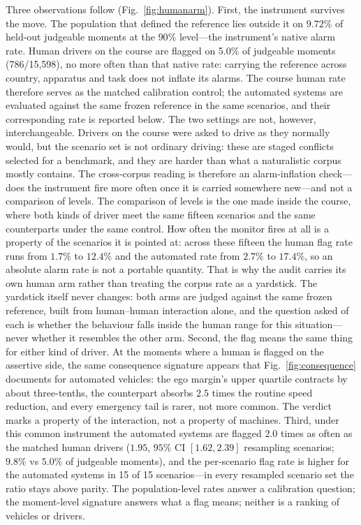 \documentclass[12pt,a4paper]{article}
\begin{document}
Three observations follow (Fig.~\ref{fig:humanarm}). First, the instrument survives the move. The
population that defined the reference lies outside it on $9.72\%$ of held-out judgeable moments at
the $90\%$ level---the instrument's native alarm rate. Human drivers on the course are flagged on
5.0\% of judgeable moments (786/15{,}598), no more often than
that native rate: carrying the reference across country, apparatus and task does not inflate its
alarms. The course human rate therefore serves as the matched calibration control; the automated systems are
evaluated against the same frozen reference in the same scenarios, and their corresponding rate is
reported below. The two settings are not, however, interchangeable. Drivers on the course were asked to drive
as they normally would, but the scenario set is not ordinary driving: these are staged conflicts
selected for a benchmark, and they are harder than what a naturalistic corpus mostly contains. The
cross-corpus reading is therefore an alarm-inflation check---does the instrument fire more often
once it is carried somewhere new---and not a comparison of levels. The comparison of levels is the
one made inside the course, where both kinds of driver meet the same fifteen scenarios and the same
counterparts under the same control. How often the monitor fires at all is a property of the
scenarios it is pointed at: across these fifteen the human flag rate runs from $1.7\%$ to $12.4\%$
and the automated rate from $2.7\%$ to $17.4\%$, so an absolute alarm rate is not a portable
quantity. That is why the audit carries its own human arm rather than treating the corpus rate as a
yardstick. The yardstick itself never changes: both arms are judged against the same frozen
reference, built from human--human interaction alone, and the question asked of each is whether the
behaviour falls inside the human range for this situation---never whether it resembles the other
arm. Second, the flag means the same thing for either kind of
driver. At the moments where a human is flagged on the assertive side, the same consequence signature appears that
Fig.~\ref{fig:consequence} documents for automated vehicles: the ego margin's upper quartile
contracts by about three-tenths, the counterpart absorbs $2.5$ times the routine speed
reduction, and every emergency tail is rarer, not more common. The verdict marks a property of the
interaction, not a property of machines. Third, under this common instrument the automated systems
are flagged $2.0$ times as often as the matched human drivers ($1.95$, $95\%$ CI $[1.62, 2.39]$
resampling scenarios; $9.8\%$ vs $5.0\%$ of judgeable moments), and the per-scenario flag rate is
higher for the automated systems in 15 of 15 scenarios---in every resampled scenario set the ratio
stays above parity. The population-level rates answer
a calibration question; the moment-level signature answers what a flag means; neither is a ranking
of vehicles or drivers.
\end{document}

